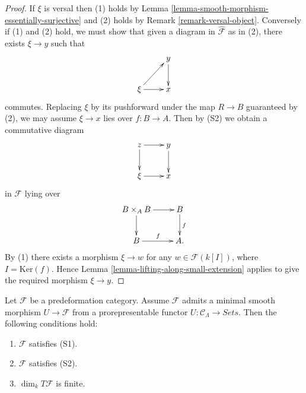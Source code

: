 \begin{proof}
If $\xi$ is versal then (1) holds by Lemma 
\ref{lemma-smooth-morphism-essentially-surjective} and (2) holds by Remark 
\ref{remark-versal-object}.  Conversely if (1) and (2) hold, we must show that 
given a diagram in $\widehat{\mathcal{F}}$ as in (2), there exists $\xi 
\to y$ such that
\[
\xymatrix{
            &  y \ar[d] \\
\xi \ar[ur] \ar[r]  &  x
}
\]
commutes. Replacing $\xi$ by its pushforward under the map $R \to B$ 
guaranteed by (2), we may assume $\xi \to x$ lies over $f: B 
\to A$.  Then by (S2) we obtain a commutative diagram
\[
\xymatrix{
z  \ar[r] \ar[d]          &  y \ar[d] \\
\xi \ar[r]  &  x
}
\]
in $\mathcal{F}$ lying over
\[
\xymatrix{
B \times_{A} B \ar[d] \ar[r] &   B  \ar[d]^{f} \\
B \ar[r]^{f} &   A .
}
\]
By (1) there exists a morphism $\xi \to w$ for any $w \in \mathcal 
F(k[I])$, where $I = \text{Ker}(f)$.  Hence Lemma 
\ref{lemma-lifting-along-small-extension} applies to give the required morphism 
$\xi \to y$. 
\end{proof}

\begin{lemma}
\label{lemma-miniversal-object-existence-1}
Let $\mathcal{F}$ be a predeformation category.  Assume $\mathcal{F}$ admits a 
minimal smooth morphism $U \to \mathcal{F}$ from a prorepresentable 
functor $U: \mathcal{C}_\Lambda \to \textit{Sets}$.  Then the 
following conditions hold:
\begin{enumerate}
\item $\mathcal{F}$ satisfies (S1).
\item $\mathcal{F}$ satisfies (S2).
\item $\dim_{k} T\mathcal{F}$ is finite.
\end{enumerate}
\end{lemma}

